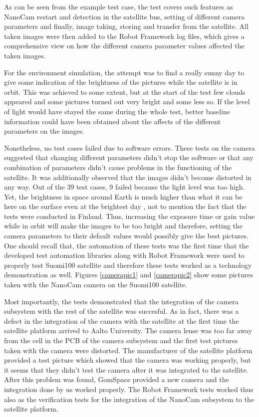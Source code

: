 \documentclass[english,12pt,a4paper,pdftex,elec,utf8]{aaltothesis}
\begin{document}
As can be seen from the example test case, the test covers such features as NanoCam restart and detection in the satellite bus, setting of different camera parameters and finally, image taking, storing and transfer from the satellite. All taken images were then added to the Robot Framework log files, which gives a comprehensive view on how the different camera parameter values affected the taken images.\par 
For the environment simulation, the attempt was to find a really sunny day to give some indication of the brightness of the pictures while the satellite is in orbit. This was achieved to some extent, but at the start of the test few clouds appeared and some pictures turned out very bright and some less so. If the level of light would have stayed the same during the whole test, better baseline information could have been obtained about the affects of the different parameters on the images.\par
Nonetheless, no test cases failed due to software errors. These tests on the camera suggested that changing different parameters didn't stop the software or that any combination of parameters didn't cause problems in the functioning of the satellite. It was additionally observed that the images didn't become distorted in any way. Out of the 39 test cases, 9 failed because the light level was too high. Yet, the brightness in space around Earth is much higher than what it can be here on the surface even at the brightest day \cite{solarradiation}, not to mention the fact that the tests were conducted in Finland. Thus, increasing the exposure time or gain value while in orbit will make the images to be too bright and therefore, setting the camera parameters to their default values would possibly give the best pictures. One should recall that, the automation of these tests was the first time that the developed test automation libraries along with Robot Framework were used to properly test Suomi100 satellite and therefore these tests worked as a technology demonstration as well. Figures \ref{camerapic1} and \ref{camerapic2} show some pictures taken with the NanoCam camera on the Suomi100 satellite. \par
Most importantly, the tests demonstrated that the integration of the camera subsystem with the rest of the satellite was succesful. As in fact, there was a defect in the integration of the camera with the satellite at the first time the satellite platform arrived to Aalto University. The camera lense was too far away from the cell in the PCB of the camera subsystem and the first test pictures taken with the camera were distorted. The manufacturer of the satellite platform provided a test picture which showed that the camera was working properly, but it seems that they didn't test the camera after it was integrated to the satellite. After this problem was found, GomSpace provided a new camera and the integration done by us worked properly. The Robot Framework tests worked thus also as the verification tests for the integration of the NanoCam subsystem to the satellite platform.\par 
\end{document}
